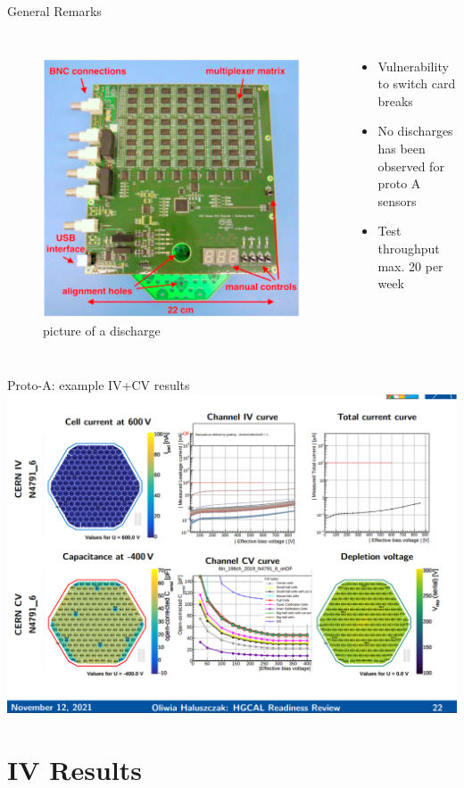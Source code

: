 \documentclass{beamer}
\begin{document}
\begin{frame}{General Remarks}
  \begin{columns}
      \begin{figure}
        \includegraphics[width=.3\textwidth]{plots/Switch_Card.png}
        picture of a discharge
      \end{figure}

    \begin{itemize}
      \item Vulnerability to switch card breaks
      \item No discharges has been observed for proto A sensors
      \item Test throughput max. 20 per week
    \end{itemize}
  \end{columns}
\end{frame}


\begin{frame}{Proto-A: example IV+CV results}
  \includegraphics[width=.8\textwidth]{plots/IV_CV_example.png}
\end{frame}
  

\section{IV Results}
\end{document}
